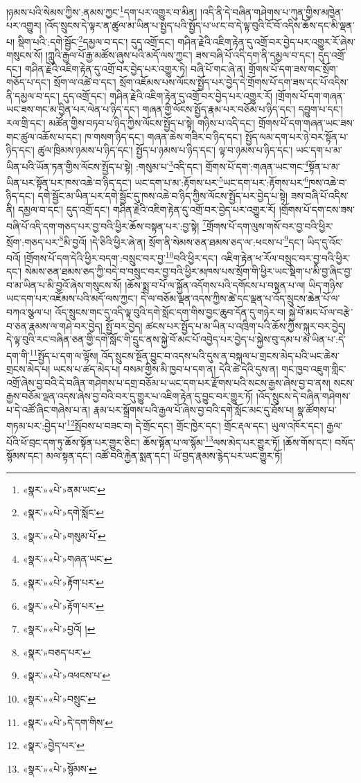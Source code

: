 །ཉམས་པའི་སེམས་ཀྱིས་:ནམས་ཀྱང་\footnote{«སྣར་»«པེ་»ནམ་ཡང་}དག་པར་འགྱུར་བ་མིན། །འདི་ནི་དེ་བཞིན་གཤེགས་པ་ཀུན་གྱིས་མཁྱེན་པར་འགྱུར། །འོད་སྲུངས་དེ་ལྟར་ན་ཚུལ་མ་ཡིན་པ་སྤྱད་པའི་སྤྱོད་པ་ཡ་ང་བ་དེ་ལྟ་བུའི་ངོ་བོ་འདིས་ཆོས་དང་མི་ལྡན་པ། སྡིག་པའི་:དགེ་སྦྱོང་\footnote{«སྣར་»«པེ་»དགེ་སློང་}དམྱལ་བ་དང་། དུད་འགྲོ་དང་། གཤིན་རྗེའི་འཇིག་རྟེན་དུ་འགྲོ་བར་བྱེད་པར་འགྱུར་རོ་ཞེས་གསུངས་སོ། །ཀླུའི་རྒྱལ་པོ་རྒྱ་མཚོས་ཞུས་པའི་མདོ་ལས་ཀྱང་། ཟས་བཞི་པོ་འདི་དག་ནི་དམྱལ་བ་དང་། དུད་འགྲོ་དང་། གཤིན་རྗེའི་འཇིག་རྟེན་དུ་འགྲོ་བར་བྱེད་པར་འགྱུར་ཏེ། བཞི་པོ་གང་ཞེ་ན། གྲོགས་པོ་དག་ཟས་གང་སྲོག་གཅོད་པ་དང་། སྲོག་ལ་འཚེ་བ་དང་། སྲོག་འཇོམས་པས་ལོངས་སྤྱོད་པར་བྱེད་དེ་གྲོགས་པོ་དག་ཟས་དང་པོ་འདིས་ནི་དམྱལ་བ་དང་། དུད་འགྲོ་དང་། གཤིན་རྗེའི་འཇིག་རྟེན་དུ་འགྲོ་བར་བྱེད་པར་འགྱུར་རོ། །གྲོགས་པོ་དག་གཞན་ཡང་ཟས་གང་མ་བྱིན་པར་ལེན་པ་ཉིད་དང་། གཞན་གྱི་ལོངས་སྤྱོད་རྣམ་པར་བཅོམ་པ་ཉིད་དང་། དབྱུག་པ་དང་། རལ་གྲི་དང་། མཚོན་གྱིས་བཏབ་པ་ཉིད་ཀྱིས་ལོངས་སྤྱོད་པ་སྟེ། གཉིས་པ་འདི་དང་། གྲོགས་པོ་དག་གཞན་ཡང་ཟས་གང་ཚུལ་འཆོས་པ་དང་། ཁ་གསག་ཉིད་དང་། གཞན་ཆེས་གཟིར་བ་ཉིད་དང་། སྤྱོད་ལམ་དག་པར་ཉེ་བར་སྟོན་པ་ཉིད་དང་། ཚུལ་ཁྲིམས་ཉམས་པ་ཉིད་དང་། སྤྱོད་པ་ཉམས་པ་ཉིད་དང་། ལྟ་བ་ཉམས་པ་ཉིད་དང་། ཡང་དག་པ་མ་ཡིན་པའི་ཡོན་ཏན་གྱིས་ལོངས་སྤྱོད་པ་སྟེ། :གསུམ་པ་\footnote{«སྣར་»«པེ་»གསུམ་པོ་}འདི་དང་། གྲོགས་པོ་དག་:གཞན་ཡང་གང་\footnote{«སྣར་»«པེ་»གཞན་ཡང་}སྟོན་པ་མ་ཡིན་པར་སྟོན་པར་ཁས་འཆེ་བ་ཉིད་དང་། ཡང་དག་པ་མ་:རྟོགས་པར་\footnote{«སྣར་»«པེ་»རྟོག་པར་}ཡང་དག་པར་:རྟོགས་པར་\footnote{«སྣར་»«པེ་»རྟོག་པར་}ཁས་འཆེ་བ་ཉིད་དང་། དགེ་སྦྱོང་མ་ཡིན་པར་དགེ་སྦྱོང་དུ་ཁས་འཆེ་བ་ཉིད་ཀྱིས་ལོངས་སྤྱོད་པར་བྱེད་པ་སྟེ། ཟས་བཞི་པོ་འདིས་ནི། དམྱལ་བ་དང་། དུད་འགྲོ་དང་། གཤིན་རྗེའི་འཇིག་རྟེན་དུ་འགྲོ་བར་བྱེད་པར་འགྱུར་རོ། །གྲོགས་པོ་དག་ངས་ཟས་བཞི་པོ་འདི་དག་གཅད་པར་བྱ་བའི་ཕྱིར་ཆོས་བསྟན་པར་:བྱ་སྟེ། \footnote{«སྣར་»«པེ་»བྱའོ། ། }གྲོགས་པོ་དག་ལུས་གསོ་བར་བྱ་བའི་ཕྱིར་སྲོག་:གཅད་པར་\footnote{«སྣར་»བཅད་པར་}མི་བྱའོ། །དེ་ཅིའི་ཕྱིར་ཞེ་ན། སྲོག་ནི་སེམས་ཅན་ཐམས་ཅད་ལ་:ཕངས་པ་\footnote{«སྣར་»«པེ་»འཕངས་པ་}དང་། ཡིད་དུ་འོང་བའོ། །གྲོགས་པོ་དག་དེའི་ཕྱིར་བདག་:བསྲུང་བར་བྱ་\footnote{«སྣར་»«པེ་»བསྲུང་}བའི་ཕྱིར་དང་། འཇིག་རྟེན་ཕ་རོལ་བསྲུང་བར་བྱ་བའི་ཕྱིར་དང་། སེམས་ཅན་ཐམས་ཅད་ཀྱི་བདེ་བ་བསྲུང་བར་བྱ་བའི་ཕྱིར་མཁས་པས་སྲོག་གི་ཕྱིར་ཡང་སྡིག་པ་མི་བྱ་ཞིང་བྱ་བ་མ་ཡིན་པ་མི་བྱའོ་ཞེས་གསུངས་སོ། །ཆོས་སྨྲ་བ་པོ་ལ་སྐྱོན་འདོགས་པའི་དགོངས་པ་བསྟན་པ་ལ། ཡིད་གཉིས་ཡང་དག་པར་འཇོམས་པའི་མདོ་ལས་ཀྱང་། དེ་ལ་བཅོམ་ལྡན་འདས་ཀྱིས་ཚེ་དང་ལྡན་པ་འོད་སྲུངས་ཆེན་པོ་ལ་བཀའ་སྩལ་པ། འོད་སྲུངས་གང་དུ་འདི་ལྟ་བུའི་དགེ་སློང་དག་གིས་བྱང་ཆུབ་དོན་དུ་གཉེར་བ། སྐྱེ་བོ་མང་པོ་ལ་བརྩེ་བ་ཅན་རྣམས་ལ་གཤེ་བར་བྱེད། སྤྱོ་བར་བྱེད། ཚངས་པར་སྤྱོད་པ་མ་ཡིན་པ་འཁྲིག་པའི་ཆོས་ཀྱིས་སྐུར་བར་བྱེད། དེ་ལྟ་བུའི་རང་བཞིན་ཅན་གྱི་དགེ་སློང་གི་དྲུང་ནས་སྐྱེ་བོ་མང་པོ་འབྱེད་པར་བྱེད་པ་སྐྱེས་བུ་དམ་པ་མ་ཡིན་པ་:དེ་དག་གི་\footnote{«སྣར་»«པེ་»དེ་དག་གིས་}སྤྱོད་པ་དག་ལ་ལྟོས། འོད་སྲུངས་སྔོན་བྱུང་བ་འདས་པའི་དུས་ན་བསྐལ་པ་གྲངས་མེད་པའི་ཡང་ཆེས་གྲངས་མེད་པ། ཡངས་པ་ཚད་མེད་པ། བསམ་གྱིས་མི་ཁྱབ་པ་དག་ན། དེའི་ཚེ་དེའི་དུས་ན། གང་ཁྱབ་འཇུག་གླིང་འགྲོ་ཞེས་བྱ་བའི་དེ་བཞིན་གཤེགས་པ་དགྲ་བཅོམ་པ་ཡང་དག་པར་རྫོགས་པའི་སངས་རྒྱས་ཞེས་བྱ་བ་ནས། སངས་རྒྱས་བཅོམ་ལྡན་འདས་ཞེས་བྱ་བའི་བར་དུ་གྱུར་པ་འཇིག་རྟེན་དུ་བྱུང་བར་གྱུར་ཏོ། །འོད་སྲུངས་དེ་བཞིན་གཤེགས་པ་དེ་འཚོ་ཞིང་གཞེས་པ་ན། རྣམ་པར་སྒྲོགས་པའི་རྒྱལ་པོ་ཞེས་བྱ་བའི་དགེ་སློང་མང་དུ་ཐོས་པ། སྣ་ཚོགས་པ་གཏམ་པར་:བྱེད་པ་\footnote{«སྣར་»བྱེད་པར་}སྤོབས་པ་བཟང་བ། དེ་གྲོང་དང་། གྲོང་ཁྱེར་དང་། གྲོང་རྡལ་དང་། ཡུལ་འཁོར་དང་། རྒྱལ་པོའི་ཕོ་བྲང་དག་ཏུ་ཆོས་སྟོན་པར་གྱུར་ཅིང་། ཆོས་སྟོན་པ་ལ་སྙོམ་\footnote{«སྣར་»«པེ་»སྙོམས་}ལས་མེད་པར་གྱུར་ཏོ། །ཆོས་གོས་དང་། བསོད་སྙོམས་དང་། མལ་སྟན་དང་། འཚོ་བའི་རྐྱེན་སྨན་དང་། ཡོ་བྱད་རྣམས་རྙེད་པར་ཡང་གྱུར་ཏོ། 
